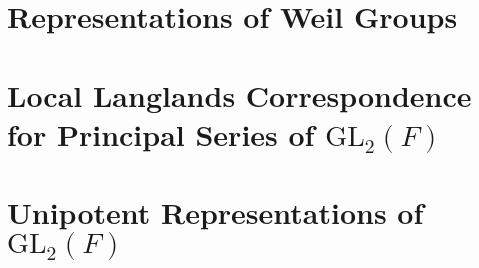 \documentclass{article}
\newcommand{\GL}{\mathrm{GL}}
\theoremstyle{plain}
\theoremstyle{definition}
\begin{document}
\section{Representations of Weil Groups}\label{sec:weil}



\section{Local Langlands Correspondence for Principal Series of \texorpdfstring{$\GL_2(F)$}{TEXT}}\label{sec:langlands}

\section{Unipotent Representations of \texorpdfstring{$\GL_2(F)$}{TEXT}}\label{sec:unipotent}

\newpage



\end{document}

